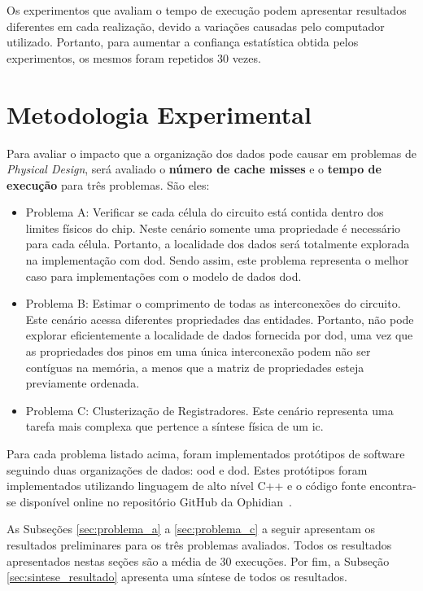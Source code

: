 Os experimentos que avaliam o tempo de execução podem apresentar resultados diferentes em cada realização, devido a variações causadas pelo computador utilizado. Portanto, para aumentar a confiança estatística obtida pelos experimentos, os mesmos foram repetidos 30 vezes.%

\section{Metodologia Experimental}
\label{sec:metodologia_experimental}

Para avaliar o impacto que a organização dos dados pode causar em problemas de \textit{Physical Design}, será avaliado o \textbf{número de cache misses} e o \textbf{tempo de execução} para três problemas. São eles:
\begin{itemize}
    \item Problema A: Verificar se cada célula do circuito está contida dentro dos  limites físicos do chip. Neste cenário somente uma propriedade é necessário para cada célula. Portanto, a localidade dos dados será totalmente explorada na implementação com \ac{dod}. Sendo assim, este problema representa o melhor caso para implementações com o modelo de dados \ac{dod}.
    \item Problema B: Estimar o comprimento de todas as interconexões do circuito. Este cenário acessa diferentes propriedades das entidades. Portanto, não pode explorar eficientemente a localidade de dados fornecida por \ac {dod}, uma vez que as propriedades dos pinos em uma única interconexão podem não ser contíguas na memória, a menos que a matriz de propriedades esteja previamente ordenada.
    \item Problema C: Clusterização de Registradores. Este cenário representa uma tarefa mais complexa que pertence a síntese física de um \ac{ic}.
\end{itemize}

Para cada problema listado acima, foram implementados protótipos de software seguindo duas organizações de dados: \ac{ood} e \ac{dod}.
Estes protótipos foram implementados utilizando linguagem de alto nível C++ e o código fonte encontra-se disponível online no repositório GitHub da Ophidian~\cite{ophidian}.

As Subseções \ref{sec:problema_a} a \ref{sec:problema_c} a seguir apresentam os resultados preliminares para os três problemas avaliados.
Todos os resultados apresentados nestas seções são a média de 30 execuções. 
Por fim, a Subseção \ref{sec:sintese_resultado} apresenta uma síntese de todos os resultados.

